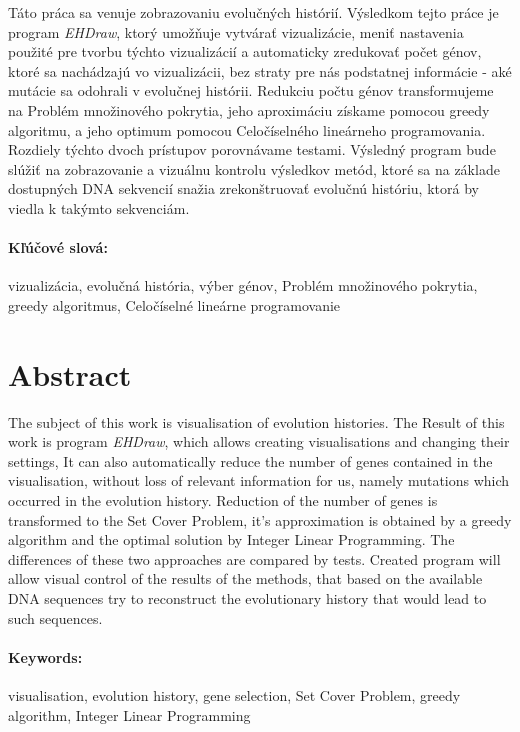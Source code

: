 \documentclass[12pt,oneside]{book}
\begin{document}
Táto práca sa venuje zobrazovaniu evolučných histórií. 
Výsledkom tejto práce je program \emph{EHDraw}, ktorý umožňuje vytvárať vizualizácie, 
meniť nastavenia použité pre tvorbu týchto vizualizácií a automaticky zredukovať počet génov, ktoré sa nachádzajú vo vizualizácii,
bez straty pre nás podstatnej informácie - aké mutácie sa odohrali v evolučnej histórii. 
Redukciu počtu génov transformujeme na Problém množinového pokrytia, jeho aproximáciu získame pomocou greedy algoritmu,
a jeho optimum pomocou Celočíselného lineárneho programovania. 
Rozdiely týchto dvoch prístupov porovnávame testami.
Výsledný program bude slúžiť na zobrazovanie a vizuálnu kontrolu výsledkov metód,
ktoré sa na základe dostupných DNA sekvencií snažia zrekonštruovať evolučnú históriu, ktorá by viedla k takýmto sekvenciám.  



\paragraph*{Kľúčové slová:} vizualizácia, evolučná história, výber génov, Problém množinového pokrytia,
greedy algoritmus, Celočíselné lineárne programovanie


\newpage 
\section*{Abstract}
The subject of this work is visualisation of evolution histories.
The Result of this work is program \emph{EHDraw}, which allows creating visualisations and
changing their settings, It can also automatically reduce the number of genes contained in the visualisation,
without loss of relevant information for us, namely mutations which occurred in the evolution history.
Reduction of the number of genes is transformed to the Set Cover Problem, it's approximation is obtained by a greedy algorithm
and the optimal solution by Integer Linear Programming.
The differences of these two approaches are compared by tests.
Created program will allow visual control of the results of the methods, that based on the available DNA sequences
try to reconstruct the evolutionary history that would lead to such sequences.


\paragraph*{Keywords:}  visualisation, evolution history, gene selection, Set Cover Problem,
greedy algorithm, Integer Linear Programming
\end{document}
